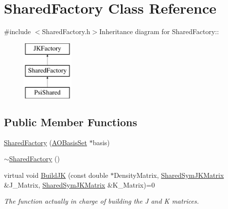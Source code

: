 \hypertarget{classJKBuilder_1_1SharedFactory}{
\section{SharedFactory Class Reference}
\label{classJKBuilder_1_1SharedFactory}
}


{\ttfamily \#include $<$SharedFactory.h$>$}Inheritance diagram for SharedFactory::\begin{figure}[H]
\begin{center}
\leavevmode
\includegraphics[height=3cm]{classJKBuilder_1_1SharedFactory}
\end{center}
\end{figure}
\subsection*{Public Member Functions}
\begin{DoxyCompactItemize}
\item 
\hyperlink{classJKBuilder_1_1SharedFactory_aaa83ebf150f7d8a94957a024e3b93251}{SharedFactory} (\hyperlink{classJKBuilder_1_1AOBasisSet}{AOBasisSet} $\ast$basis)
\item 
\hyperlink{classJKBuilder_1_1SharedFactory_af0da783c0ceefa7d1f2bf9be1cd53ba6}{$\sim$SharedFactory} ()
\item 
virtual void \hyperlink{classJKBuilder_1_1JKFactory_ae253b309dafe3ce003fdabfd315318b8}{BuildJK} (const double $\ast$DensityMatrix, \hyperlink{namespaceJKBuilder_aef21bc37b7cf7bc5ebb5a48628db8d0f}{SharedSymJKMatrix} \&J\_\-Matrix, \hyperlink{namespaceJKBuilder_aef21bc37b7cf7bc5ebb5a48628db8d0f}{SharedSymJKMatrix} \&K\_\-Matrix)=0
\begin{DoxyCompactList}\small\item\em The function actually in charge of building the J and K matrices. \item\end{DoxyCompactList}\end{DoxyCompactItemize}
